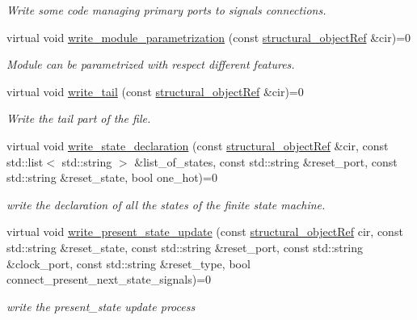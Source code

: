 \begin{DoxyCompactItemize}
\begin{DoxyCompactList}\small\item\em Write some code managing primary ports to signals connections. \end{DoxyCompactList}\item 
virtual void \hyperlink{classlanguage__writer_a393febaf037080d4a91588cfa699c8cb}{write\+\_\+module\+\_\+parametrization} (const \hyperlink{structural__objects_8hpp_a8ea5f8cc50ab8f4c31e2751074ff60b2}{structural\+\_\+object\+Ref} \&cir)=0
\begin{DoxyCompactList}\small\item\em Module can be parametrized with respect different features. \end{DoxyCompactList}\item 
virtual void \hyperlink{classlanguage__writer_aa244ceb9a8c0033a75c5b885df4693c8}{write\+\_\+tail} (const \hyperlink{structural__objects_8hpp_a8ea5f8cc50ab8f4c31e2751074ff60b2}{structural\+\_\+object\+Ref} \&cir)=0
\begin{DoxyCompactList}\small\item\em Write the tail part of the file. \end{DoxyCompactList}\item 
virtual void \hyperlink{classlanguage__writer_a3325b6d77049e7f4bf39b1c4758df5e8}{write\+\_\+state\+\_\+declaration} (const \hyperlink{structural__objects_8hpp_a8ea5f8cc50ab8f4c31e2751074ff60b2}{structural\+\_\+object\+Ref} \&cir, const std\+::list$<$ std\+::string $>$ \&list\+\_\+of\+\_\+states, const std\+::string \&reset\+\_\+port, const std\+::string \&reset\+\_\+state, bool one\+\_\+hot)=0
\begin{DoxyCompactList}\small\item\em write the declaration of all the states of the finite state machine. \end{DoxyCompactList}\item 
virtual void \hyperlink{classlanguage__writer_accbef441e192407932159b5a4d885cda}{write\+\_\+present\+\_\+state\+\_\+update} (const \hyperlink{structural__objects_8hpp_a8ea5f8cc50ab8f4c31e2751074ff60b2}{structural\+\_\+object\+Ref} cir, const std\+::string \&reset\+\_\+state, const std\+::string \&reset\+\_\+port, const std\+::string \&clock\+\_\+port, const std\+::string \&reset\+\_\+type, bool connect\+\_\+present\+\_\+next\+\_\+state\+\_\+signals)=0
\begin{DoxyCompactList}\small\item\em write the present\+\_\+state update process \end{DoxyCompactList}\item 

\end{DoxyCompactItemize}
